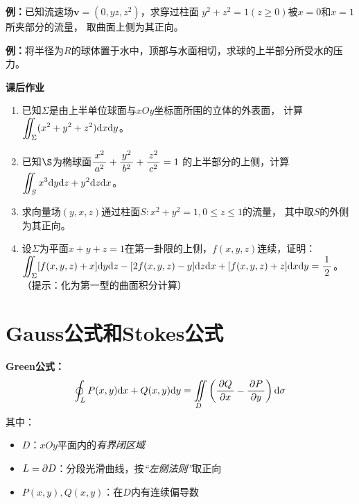 % 

{\bf 例：}已知流速场$\bm{v}=(0,yz,z^2)$，求穿过柱面
$y^2+z^2=1(z\geq 0)$被$x=0$和$x=1$所夹部分的流量，
取曲面上侧为其正向。

{\bf 例：}将半径为$R$的球体置于水中，顶部与水面相切，求球的上半部分所受水的压力。

\begin{ext}
	{\bf 课后作业}
	\begin{enumerate}
	  \item 已知$\Sigma$是由上半单位球面与$xOy$坐标面所围的立体的外表面，
	  计算$\displaystyle\iint_{\Sigma}(x^2+y^2+z^2)\mathrm{d} x\mathrm{d} y$。
	  \item 已知$\S$为椭球面$\displaystyle\frac{\,{x^2}\,}{\,{a^2}\,}+\displaystyle\frac{\,{y^2}\,}{\,{b^2}\,}+\displaystyle\frac{\,{z^2}\,}{\,{c^2}\,}=1$
	  的上半部分的上侧，计算$\displaystyle\iint_Sx^3\mathrm{d} y\mathrm{d} z+y^2\mathrm{d} z\mathrm{d} x$。
	  \item 求向量场$(y,x,z)$通过柱面$S:x^2+y^2=1,0\leq z\leq 1$的流量，
	  其中取$S$的外侧为其正向。
	  \item 设$\Sigma$为平面$x+y+z=1$在第一卦限的上侧，$f(x,y,z)$连续，证明：
	  $\displaystyle\iint_{\Sigma}[f(x,y,z)+x]\mathrm{d} y\mathrm{d} z-[2f(x,y,z)-y]\mathrm{d} z\mathrm{d} x+
	  [f(x,y,z)+z]\mathrm{d} x\mathrm{d} y=\displaystyle\frac{\,{1}\,}{\,{2}\,}$。（提示：化为第一型的曲面积分计算）
	\end{enumerate}
\end{ext}

\section{Gauss公式和Stokes公式}

{\bf Green公式：}
$$\oint_LP(x,y)\mathrm{d} x+Q(x,y)\mathrm{d} y=\iint\limits_D\left(
\displaystyle\frac{\,{\partial Q}\,}{\,{\partial x}\,}-\displaystyle\frac{\,{\partial P}\,}{\,{\partial y}\,}\right)\mathrm{d}\sigma $$
其中：
\begin{itemize}
  \item {$D$：}$xOy$平面内的{\it 有界闭区域}
  \item {$L=\partial D$：}分段光滑曲线，按{\it “左侧法则”}取正向
  \item {$P(x,y),Q(x,y)$：}在$D$内有连续偏导数
\end{itemize}

